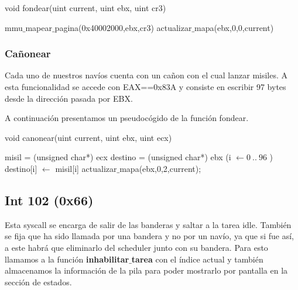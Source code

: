 \begin{algorithm}[h!]
\caption{void fondear(uint current, uint ebx, uint cr3)}
\begin{algorithmic}
	\State mmu$\_$mapear$\_$pagina(0x40002000,ebx,cr3)
	\State actualizar$\_$mapa(ebx,0,0,current)
\end{algorithmic}
\end{algorithm}
\subsubsection{Cañonear}
\par{Cada uno de nuestros navíos cuenta con un cañon con el cual lanzar misiles. A esta funcionalidad se accede con EAX==0x83A y consiste en escribir 97 bytes desde la dirección pasada por EBX.}
\par{A continuación presentamos un pseudocógido de la función fondear.}

\begin{algorithm}[h!]
\caption{void canonear(uint current, uint ebx, uint ecx)}
\begin{algorithmic}
	\State misil = (unsigned char*) ecx
	\State destino = (unsigned char*) ebx
	\For (i $\gets 0~..~96$ )
	\State destino[i] $\gets$ misil[i]
	\EndFor
	\State actualizar$\_$mapa(ebx,0,2,current);
\end{algorithmic}
\end{algorithm}


	
\subsection{Int 102 (0x66)}
\par{Esta syscall se encarga de salir de las banderas y saltar a la tarea idle. También se fija que ha sido llamada por una bandera y no por un navío, ya que si fue así, a este habrá que eliminarlo del scheduler junto con su bandera. Para esto llamamos a la función \textbf{inhabilitar$\_$tarea} con el índice actual y también almacenamos la información de la pila para poder mostrarlo por pantalla en la sección de estados.}